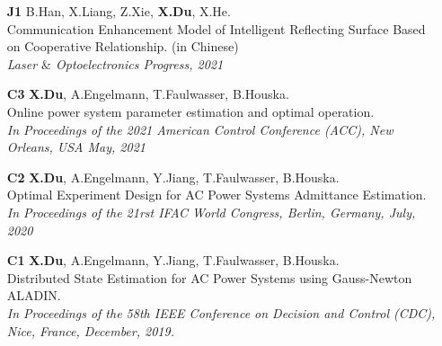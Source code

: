 \documentclass[paper=a4,fontsize=11pt]{scrartcl} %
\begin{document}
\begin{itemize}
			\item [\textbf{J1}]   { B.Han, X.Liang, Z.Xie, \textbf{X.Du}, X.He. \\
				{Communication Enhancement Model of Intelligent Reflecting Surface Based on Cooperative Relationship. (in Chinese)}\\
				\emph{Laser $\&$ Optoelectronics Progress, 2021
			} }
			
			\item [\textbf{C3}]   { \textbf{X.Du}, A.Engelmann, T.Faulwasser, B.Houska. \\
				{Online power system parameter estimation and optimal operation.}\\
				\emph{In Proceedings of the 2021 American Control Conference (ACC), New Orleans, USA May, 2021
			} }
			
			\item [\textbf{C2}]   {\textbf{X.Du}, A.Engelmann, Y.Jiang, T.Faulwasser, B.Houska. \\
				Optimal Experiment Design for AC Power Systems Admittance Estimation.\\
				\emph{In Proceedings of the 21rst IFAC World Congress, Berlin, Germany, July, 2020
			} }
			
			\item [\textbf{C1}]  {\textbf{X.Du}, A.Engelmann, Y.Jiang, T.Faulwasser, B.Houska. \\
				Distributed State Estimation for AC Power Systems using Gauss-Newton ALADIN. \\
				\emph{In Proceedings of the 58th IEEE Conference on Decision and Control (CDC),
					Nice, France, December, 2019.} }
		\end{itemize}
		
\end{document}
